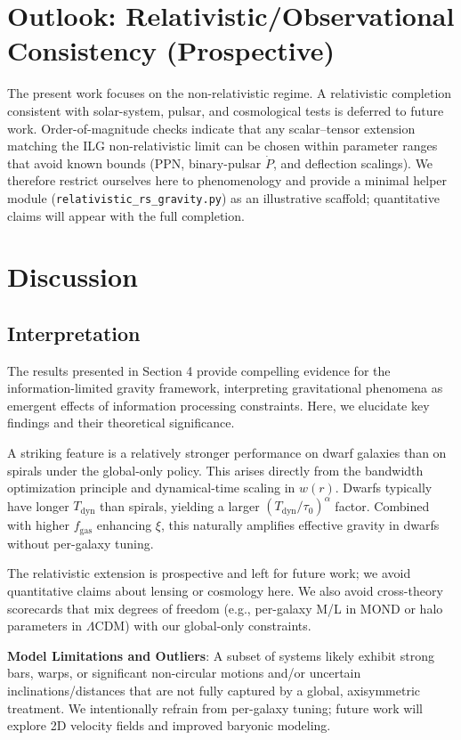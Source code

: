\documentclass[usenatbib]{mnras}
\begin{document}
\section{Outlook: Relativistic/Observational Consistency (Prospective)}

The present work focuses on the non-relativistic regime. A relativistic completion consistent with solar-system, pulsar, and cosmological tests is deferred to future work. Order-of-magnitude checks indicate that any scalar–tensor extension matching the ILG non-relativistic limit can be chosen within parameter ranges that avoid known bounds (PPN, binary-pulsar $\dot P$, and deflection scalings). We therefore restrict ourselves here to phenomenology and provide a minimal helper module (\texttt{relativistic\_rs\_gravity.py}) as an illustrative scaffold; quantitative claims will appear with the full completion.

\section{Discussion}

\subsection{Interpretation}

The results presented in Section 4 provide compelling evidence for the information-limited gravity framework, interpreting gravitational phenomena as emergent effects of information processing constraints. Here, we elucidate key findings and their theoretical significance.

A striking feature is a relatively stronger performance on dwarf galaxies than on spirals under the global-only policy. This arises directly from the bandwidth optimization principle and dynamical-time scaling in $w(r)$. Dwarfs typically have longer $T_\mathrm{dyn}$ than spirals, yielding a larger $(T_\mathrm{dyn}/\tau_0)^\alpha$ factor. Combined with higher $f_\mathrm{gas}$ enhancing $\xi$, this naturally amplifies effective gravity in dwarfs without per-galaxy tuning.

The relativistic extension is prospective and left for future work; we avoid quantitative claims about lensing or cosmology here. We also avoid cross-theory scorecards that mix degrees of freedom (e.g., per-galaxy M/L in MOND or halo parameters in $\Lambda$CDM) with our global-only constraints.

\textbf{Model Limitations and Outliers}: A subset of systems likely exhibit strong bars, warps, or significant non-circular motions and/or uncertain inclinations/distances that are not fully captured by a global, axisymmetric treatment. We intentionally refrain from per-galaxy tuning; future work will explore 2D velocity fields and improved baryonic modeling.
\end{document}
